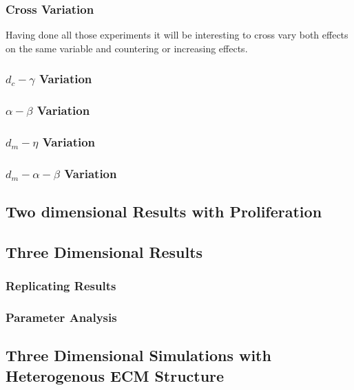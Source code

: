 \subsubsection*{Cross Variation}
Having done all those experiments it will be interesting to cross vary both effects on the same variable and countering or increasing effects.

\subsubsection*{$d_c - \gamma$ Variation}

\subsubsection*{$\alpha - \beta$ Variation}

\subsubsection*{$d_m - \eta$ Variation}

\subsubsection*{$d_m - \alpha - \beta$ Variation}


\subsection{Two dimensional Results with Proliferation}


\subsection{Three Dimensional Results}
\subsubsection{Replicating Results}
\subsubsection{Parameter Analysis}
\subsection{Three Dimensional Simulations with Heterogenous ECM Structure}
